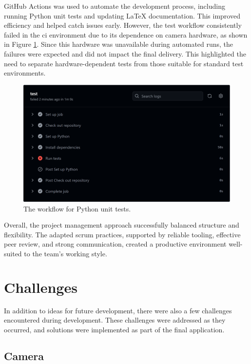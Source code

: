 GitHub Actions was used to automate the development process, including running Python unit tests and updating LaTeX documentation. This improved efficiency and helped catch issues early. However, the test workflow consistently failed in the \gls{ci} environment due to its dependence on camera hardware, as shown in Figure \ref{fig:workflow-test}. Since this hardware was unavailable during automated runs, the failures were expected and did not impact the final delivery. This highlighted the need to separate hardware-dependent tests from those suitable for standard test environments.\\

\begin{figure}[h!] 
    \centering 
    \includegraphics[width=0.75\linewidth]{figures/results/workflows/tests.png}
    \caption[Python tests workflow]{The workflow for Python unit tests.}
    \label{fig:workflow-test}
\end{figure}

Overall, the project management approach successfully balanced structure and flexibility. The adapted \gls{scrum} practices, supported by reliable tooling, effective peer review, and strong communication, created a productive environment well-suited to the team's working style. 

\newpage

\section{Challenges}
In addition to ideas for future development, there were also a few challenges encountered during development. These challenges were addressed as they occurred, and solutions were implemented as part of the final application. \\

\subsection{Camera}

